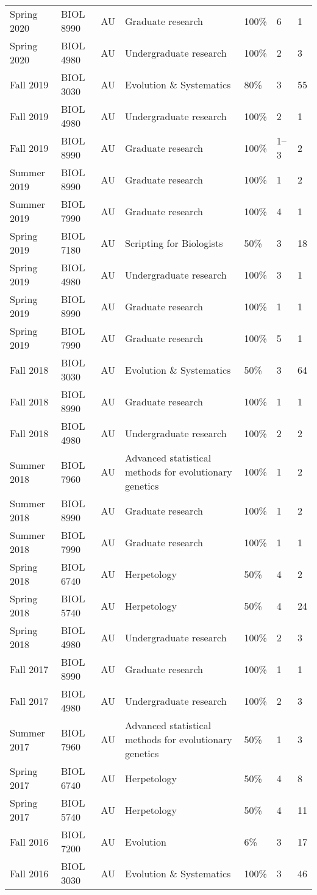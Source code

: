 {\begin{longtable}[l]{ p{0.79in} p{0.65in} p{0.60in} p{1.7in} p{0.58in} p{0.34in} p{0.70in} }
    Spring 2020 & BIOL 8990 & AU & Graduate research & 100\% & 6 & 1 \\ 
    Spring 2020 & BIOL 4980 & AU & Undergraduate research & 100\% & 2 & 3 \\ 
    Fall 2019 & BIOL 3030 & AU & Evolution \& Systematics & 80\% & 3 & 55 \\
    Fall 2019 & BIOL 4980 & AU & Undergraduate research & 100\% & 2 & 1 \\ 
    Fall 2019 & BIOL 8990 & AU & Graduate research & 100\% & 1--3 & 2 \\ 
    Summer 2019 & BIOL 8990 & AU & Graduate research & 100\% & 1 & 2 \\ 
    Summer 2019 & BIOL 7990 & AU & Graduate research & 100\% & 4 & 1 \\ 
    Spring 2019 & BIOL 7180 & AU & Scripting for Biologists & 50\% & 3 & 18 \\
    Spring 2019 & BIOL 4980 & AU & Undergraduate research & 100\% & 3 & 1 \\ 
    Spring 2019 & BIOL 8990 & AU & Graduate research & 100\% & 1 & 1 \\ 
    Spring 2019 & BIOL 7990 & AU & Graduate research & 100\% & 5 & 1 \\ 
    Fall 2018 & BIOL 3030 & AU & Evolution \& Systematics & 50\% & 3 & 64 \\
    Fall 2018 & BIOL 8990 & AU & Graduate research & 100\% & 1 & 1 \\ 
    Fall 2018 & BIOL 4980 & AU & Undergraduate research & 100\% & 2 & 2 \\ 
    Summer 2018 & BIOL 7960 & AU & Advanced statistical methods for evolutionary genetics & 100\% & 1 & 2 \\
    Summer 2018 & BIOL 8990 & AU & Graduate research & 100\% & 1 & 2 \\ 
    Summer 2018 & BIOL 7990 & AU & Graduate research & 100\% & 1 & 1 \\ 
    Spring 2018 & BIOL 6740 & AU & Herpetology & 50\% & 4 & 2 \\
    Spring 2018 & BIOL 5740 & AU & Herpetology & 50\% & 4 & 24 \\
    Spring 2018 & BIOL 4980 & AU & Undergraduate research & 100\% & 2 & 3 \\ 
    Fall 2017 & BIOL 8990 & AU & Graduate research & 100\% & 1 & 1 \\ 
    Fall 2017 & BIOL 4980 & AU & Undergraduate research & 100\% & 2 & 3 \\ 
    Summer 2017 & BIOL 7960 & AU & Advanced statistical methods for evolutionary genetics & 50\% & 1 & 3 \\
    Spring 2017 & BIOL 6740 & AU & Herpetology & 50\% & 4 & 8 \\
    Spring 2017 & BIOL 5740 & AU & Herpetology & 50\% & 4 & 11 \\
    Fall 2016 & BIOL 7200 & AU & Evolution & 6\% & 3 & 17 \\
    Fall 2016 & BIOL 3030 & AU & Evolution \& Systematics & 100\% & 3 & 46 \\
\end{longtable}
}
